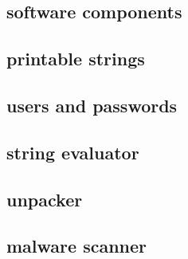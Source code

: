 \documentclass{article}
\begin{document}
\subsection*{software components}


\subsection*{printable strings}


\subsection*{users and passwords}


\subsection*{string evaluator}


\subsection*{unpacker}


\subsection*{malware scanner}

\end{document}
